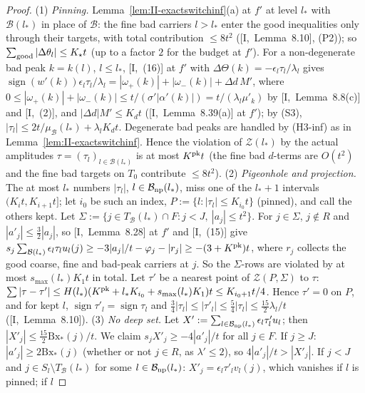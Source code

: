 \documentclass[10pt]{amsart}
\theoremstyle{definition}
\theoremstyle{remark}
\newcommand{\sgn}{\operatorname{sign}}
\begin{document}
\begin{proof}
(1) \emph{Pinning.}  Lemma~\ref{lem:II-exactswitchinf}(a) at $f'$ at level
$l_*$ with $\mathcal B(l_*)$ in place of $\mathcal B$: the fine bad carriers
$l>l_*$ enter the good inequalities only through their targets, with total
contribution $\le8t^2$ ([I,~Lemma~8.10], (P2)); so $\sum_{\rm good}|\Delta
\theta_l|\le K_\star t$ (up to a factor $2$ for the budget at $f'$).  For a
non-degenerate bad peak $k=k(l)$, $l\le l_*$, [I,~(16)] at $f'$ with
$\Delta\Theta(k)=-\epsilon_l\tau_l/\lambda_l$ gives $\sgn(w'(k))\epsilon_l\tau_l/
\lambda_l=|\omega_+(k)|+|\omega_-(k)|+\Delta d\,M'$, where $0\le|\omega_+(k)|+
|\omega_-(k)|\le t/(\sigma'|\alpha'(k)|)=t/(\lambda_l\mu'_k)$ by
[I,~Lemma~8.8(c)] and [I,~(2)], and $|\Delta d|M'\le K_dt$
([I,~Lemma~8.39(a)] at $f'$); by (S3), $|\tau_l|\le2t/\mu_{\mathcal B}(l_*)+
\lambda_lK_dt$.  Degenerate bad peaks are handled by (H3-inf) as in
Lemma~\ref{lem:II-exactswitchinf}.  Hence the violation of $\mathcal Z(l_*)$ by
the actual amplitudes $\tau=(\tau_l)_{l\in\mathcal B(l_*)}$ is at most
$K^{\rm pk}t$ (the fine bad $d$-terms are $O(t^2)$ and the fine bad targets on
$T_0$ contribute $\le8t^2$).
(2) \emph{Pigeonhole and projection.}  The at most $l_*$ numbers $|\tau_l|$,
$l\in\mathcal B_{\rm np}(l_*)$, miss one of the $l_*+1$ intervals
$(K_it,K_{i+1}t]$; let $i_0$ be such an index, $P:=\{l:|\tau_l|\le K_{i_0}t\}$
(pinned), and call the others kept.  Let $\Sigma:=\{j\in T_{\mathcal B}(l_*)\cap
F:j<J,\ |a_j|\le t^2\}$.  For $j\in\Sigma$, $j\notin R$ and $|a'_j|\le\frac32
|a_j|$, so [I,~Lemma~8.28] at $f'$ and [I,~(15)] give $s_j\sum_{\mathcal B(l_*)}
\epsilon_l\tau_lu_l(j)\ge-3|a_j|/t-\varphi_j-|r_j|\ge-(3+K^{\rm pk})t$, where
$r_j$ collects the good coarse, fine and bad-peak carriers at $j$.  So the
$\Sigma$-rows are violated by at most $s_{\max}(l_*)K_1t$ in total.  Let $\tau'$
be a nearest point of $\mathcal Z(P,\Sigma)$ to $\tau$: $\sum|\tau-\tau'|\le
H(l_*)(K^{\rm pk}+l_*K_{i_0}+s_{\max}(l_*)K_1)t\le K_{i_0+1}t/4$.  Hence
$\tau'=0$ on $P$, and for kept $l$, $\sgn\tau'_l=\sgn\tau_l$ and
$\frac34|\tau_l|\le|\tau'_l|\le\frac54|\tau_l|\le\frac{15}2\lambda_l/t$
([I,~Lemma~8.10]).
(3) \emph{No deep set.}  Let $X':=\sum_{l\in\mathcal B_{\rm np}(l_*)}\epsilon_l
\tau'_lu_l$; then $|X'_j|\le\frac{15}2\mathrm{Bx}_*(j)/t$.  We claim
$s_jX'_j\ge-4|a'_j|/t$ for all $j\in F$.  If $j\ge J$: $|a'_j|\ge2\mathrm{Bx}_*(j)$
(whether or not $j\in R$, as $\lambda'\le2$), so $4|a'_j|/t>|X'_j|$.  If $j<J$
and $j\in S_l\setminus T_{\mathcal B}(l_*)$ for some $l\in\mathcal B_{\rm np}
(l_*)$: $X'_j=\epsilon_l\tau'_lv_l(j)$, which vanishes if $l$ is pinned; if $l$

\end{proof}
\end{document}
